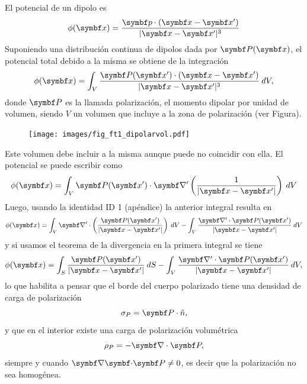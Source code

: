 \documentclass[10pt,oneside]{CBFT_book}
\begin{document}
El potencial de un dipolo es
\[
	\phi(\vb{x}) = \frac{ \vb{p}\cdot(\vb{x}-\vb{x}') }{|\vb{x} - \vb{x}'|^3} 
\]
Suponiendo una distribución continua de dipolos dada por $\vb{P}(\vbx)$, el potencial total debido
a la misma se obtiene de la integración
\[
	\phi(\vb{x}) = \int_V \frac{ \vb{P}(\vb{x}')\cdot(\vb{x}-\vb{x}') }{|\vb{x} - \vb{x}'|^3}  \: dV,
\]
donde $\vb{P}$ es la llamada polarización, el momento dipolar por unidad de volumen, siendo $V$ un volumen
que incluye a la zona de polarización (ver Figura).
\begin{figure}[htb]
	\begin{center}
	\texttt{[image: images/fig\_ft1\_dipolarvol.pdf]}	 
	\end{center}
	\caption{}
\end{figure}
Este volumen debe incluir a la misma aunque puede no coincidir con ella.
El potencial se puede escribir como 
\[
	\phi(\vb{x}) = \int_V \vb{P}(\vb{x}')\cdot \Nabla' \left(\frac{1}{|\vb{x} - \vb{x}'|} \right)\: dV
\]
Luego, usando la identidad ID 1 (apéndice) la anterior integral resulta en
\[
	\phi(\vb{x}) = \int_V  \Nabla' \cdot \left( \frac{\vb{P}(\vb{x}')}{|\vb{x} - \vb{x}'|} \right) \: dV
	- \int_V \frac{ \Nabla' \cdot \vb{P}(\vb{x}') }{|\vb{x} - \vb{x}'|} \: dV
\]
y si usamos el teorema de la divergencia en la primera integral se tiene
\[
	\phi(\vb{x}) = \int_S \frac{\vb{P}(\vb{x}')}{ |\vb{x} - \vb{x}'|} \: dS
	- \int_V  \frac{  \Nabla' \cdot \vb{P}(\vb{x}') }{|\vb{x} - \vb{x}'|} \: dV, 
\]
lo que habilita a pensar que el borde del cuerpo polarizado tiene una densidad de carga
de polarización
\[
	\sigma_P = \vb{P}\cdot\hat{n},
\]
y que en el interior existe una carga de polarización volumétrica
\[
	\rho_P = - \Nabla\cdot\vb{P},
\]
siempre y cuando $\divem{P}\neq 0$, es decir que la polarización no sea homogénea.
\end{document}
